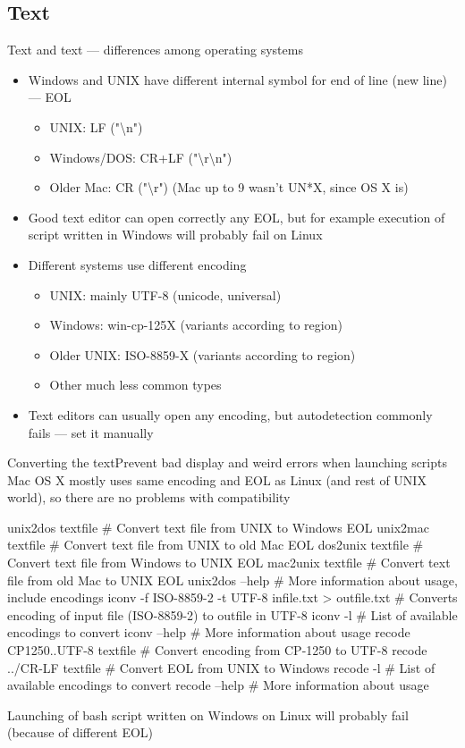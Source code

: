 \documentclass[hyperref={bookmarks=true, unicode=true, colorlinks=true, pdftitle={Linux, command line and MetaCentrum}, plainpages=false, pdfauthor={Vojtech Zeisek}, pdfsubject={Course about use of Linux command line, writing shell scripts and using MetaCentrum of CESNET}, pdfcreator={XeLaTeX, http://www.xelatex.org/}, pdfkeywords={Linux, GNU, BASH, shell, command line, MetaCentrum}, linkcolor=Sienna, anchorcolor=black, citecolor=green, filecolor=magenta, menucolor=Sienna, urlcolor=cyan, pdftex}, compress, ucs, xelatex, xcolor=svgnames, 11pt]{beamer}
\begin{document}
\subsection{Text}

\begin{frame}{Text and text --- differences among operating systems}
\begin{itemize}
  \item Windows and UNIX have different internal symbol for end of line (new line) --- EOL
  \begin{itemize}
    \item UNIX: LF ("\textbackslash n")
    \item Windows/DOS: CR+LF ("\textbackslash r\textbackslash n")
    \item Older Mac: CR ("\textbackslash r") (Mac up to 9 wasn't UN*X, since OS X is)
  \end{itemize}
  \item Good text editor can open correctly any EOL, but for example execution of script written in Windows will probably fail on Linux
  \item Different systems use different encoding
  \begin{itemize}
    \item UNIX: mainly UTF-8 (unicode, universal)
    \item Windows: win-cp-125X (variants according to region)
    \item Older UNIX: ISO-8859-X (variants according to region)
    \item Other much less common types
  \end{itemize}
  \item Text editors can usually open any encoding, but autodetection commonly fails --- set it manually
\end{itemize}
\end{frame}

\begin{frame}[fragile]{Converting the text}{Prevent bad display and weird errors when launching scripts}
  Mac OS X mostly uses same encoding and EOL as Linux (and rest of UNIX world), so there are no problems with compatibility
  \begin{bashcode}
    unix2dos textfile # Convert text file from UNIX to Windows EOL
    unix2mac textfile # Convert text file from UNIX to old Mac EOL
    dos2unix textfile # Convert text file from Windows to UNIX EOL
    mac2unix textfile # Convert text file from old Mac to UNIX EOL
    unix2dos --help # More information about usage, include encodings
    iconv -f ISO-8859-2 -t UTF-8 infile.txt > outfile.txt
      # Converts encoding of input file (ISO-8859-2) to outfile in UTF-8
    iconv -l # List of available encodings to convert
    iconv --help # More information about usage
    recode CP1250..UTF-8 textfile # Convert encoding from CP-1250 to UTF-8
    recode ../CR-LF textfile # Convert EOL from UNIX to Windows
    recode -l # List of available encodings to convert
    recode --help # More information about usage
  \end{bashcode}
  Launching of bash script written on Windows on Linux will probably fail (because of different EOL)
\end{frame}
\end{document}
